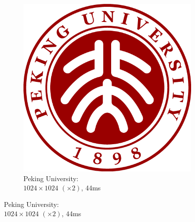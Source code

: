 \documentclass[UTF8]{ctexart}
\begin{document}
\begin{figure}[H]
\begin{subfigure}[b]{0.6\textwidth}
        \centering
        \includegraphics[width=\textwidth]{images/Peking University-1024x1024-x2-44ms.png}
        \caption{Peking University: \\$1024 \times 1024$ $(\times 2)$, 44ms}
    \end{subfigure}
\end{figure}
\end{document}
